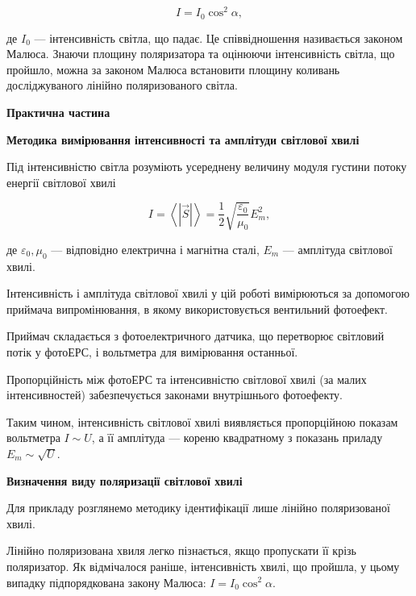 \documentclass[12pt,a4paper]{article}
\begin{document}
    \begin{equation}
        I = I_0 \cos^2 \alpha,
        \tag{5.2}
    \end{equation}

    де $I_0$ --- інтенсивність світла, що падає. Це співвідношення називається законом Малюса.
    Знаючи площину поляризатора та оцінюючи інтенсивність світла, що пройшло, можна
    за законом Малюса встановити площину коливань досліджуваного лінійно
    поляризованого світла.

    \begin{center} \textbf{\large Практична частина} \end{center}

    \begin{center} \textbf{Методика вимірювання інтенсивності та амплітуди світлової хвилі} \end{center}

    Під інтенсивністю світла розуміють усереднену величину модуля
    густини потоку енергії світлової хвилі

    \begin{equation}
        I = \left\langle \left| \vec{S} \right| \right\rangle = \frac{1}{2} \sqrt{\frac{\varepsilon_0}{\mu_0}}E_m^2,
        \tag{5.3}
    \end{equation}

    де $\varepsilon_0, \mu_0$ --- відповідно електрична і магнітна сталі,
    $E_m$ --- амплітуда світлової хвилі.

    Інтенсивність і амплітуда світлової хвилі у цій роботі вимірюються за допомогою
    приймача випромінювання, в якому використовується вентильний фотоефект.

    Приймач складається з фотоелектричного датчика, що перетворює світловий
    потік у фотоЕРС, і вольтметра для вимірювання останньої.

    Пропорційність між фотоЕРС та інтенсивністю світлової хвилі (за малих
    інтенсивностей) забезпечується законами внутрішнього фотоефекту.

    Таким чином, інтенсивність світлової хвилі виявляється пропорційною показам
    вольтметра $I \sim U$, а її амплітуда --- кореню квадратному з показань приладу
    $E_m \sim \sqrt{U}$.

    \textbf{Визначення виду поляризації світлової хвилі}

    Для прикладу розглянемо методику ідентифікації лише лінійно поляризованої хвилі.

    Лінійно поляризована хвиля легко пізнається, якщо пропускати її крізь
    поляризатор. Як відмічалося раніше, інтенсивність хвилі, що пройшла, у цьому випадку
    підпорядкована закону Малюса: $I = I_0 \cos^2 \alpha$.
\end{document}

